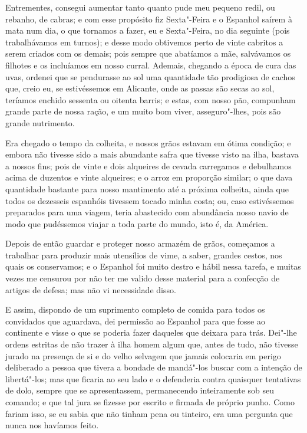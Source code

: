 Entrementes, consegui aumentar tanto quanto pude meu pequeno redil, ou
rebanho, de cabras; e com esse propósito fiz Sexta"-Feira e o Espanhol
saírem à mata num dia, o que tornamos a fazer, eu e Sexta"-Feira, no dia
seguinte (pois trabalhávamos em turnos); e desse modo obtivemos perto de
vinte cabritos a serem criados com os demais; pois sempre que abatíamos
a mãe, salvávamos os filhotes e os incluíamos em nosso curral. Ademais,
chegando a época de cura das uvas, ordenei que se pendurasse ao sol uma
quantidade tão prodigiosa de cachos que, creio eu, se estivéssemos em
Alicante, onde as passas são secas ao sol, teríamos enchido sessenta ou
oitenta barris; e estas, com nosso pão, compunham grande parte de nossa
ração, e um muito bom viver, asseguro"-lhes, pois são grande nutrimento.

Era chegado o tempo da colheita, e nossos grãos estavam em ótima
condição; e embora não tivesse sido a mais abundante safra que tivesse
visto na ilha, bastava a nossos fins; pois de vinte e dois alqueires de
cevada carregamos e debulhamos acima de duzentos e vinte alqueires; e o
arroz em proporção similar; o que dava quantidade bastante para nosso
mantimento até a próxima colheita, ainda que todos os dezesseis
espanhóis tivessem tocado minha costa; ou, caso estivéssemos preparados
para uma viagem, teria abastecido com abundância nosso navio de modo que
pudéssemos viajar a toda parte do mundo, isto é, da América.

Depois de então guardar e proteger nosso armazém de grãos, começamos a
trabalhar para produzir mais utensílios de vime, a saber, grandes
cestos, nos quais os conservamos; e o Espanhol foi muito destro e hábil
nessa tarefa, e muitas vezes me censurou por não ter me valido desse
material para a confecção de artigos de defesa; mas não vi necessidade
disso.

E assim, dispondo de um suprimento completo de comida para todos os
convidados que aguardava, dei permissão ao Espanhol para que fosse ao
continente e visse o que se poderia fazer daqueles que deixara para
trás. Dei"-lhe ordens estritas de não trazer à ilha homem algum que,
antes de tudo, não tivesse jurado na presença de si e do velho selvagem
que jamais colocaria em perigo deliberado a pessoa que tivera a bondade
de mandá"-los buscar com a intenção de libertá"-los; mas que ficaria ao
seu lado e o defenderia contra quaisquer tentativas de dolo, sempre que
se apresentassem, permanecendo inteiramente sob seu comando; e que tal
jura se fizesse por escrito e firmada de próprio punho. Como fariam
isso, se eu sabia que não tinham pena ou tinteiro, era uma pergunta que
nunca nos havíamos feito.

